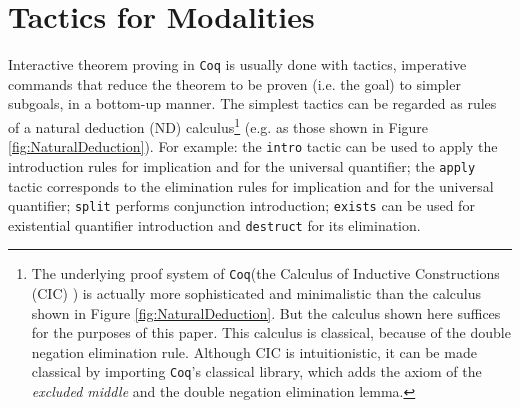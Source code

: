 \documentclass{llncs}
\newcommand{\Coq}{\texttt{Coq}\xspace}
\begin{document}
\section{Tactics for Modalities}
\label{sec:Tactics}

Interactive theorem proving in \Coq is usually done with tactics,
imperative commands that reduce the theorem to be proven (i.e. the
goal) to simpler subgoals, in a bottom-up manner. The simplest tactics
can be regarded as rules of a natural deduction (ND) calculus\footnote{The
underlying proof system of \Coq (the Calculus of Inductive
Constructions (CIC) \cite{Paulin}) is actually more sophisticated and
minimalistic than the calculus shown in Figure
\ref{fig:NaturalDeduction}. But the calculus shown here suffices for
the purposes of this paper. This calculus is classical, because of the double negation elimination rule. Although CIC is intuitionistic, it can be made classical by importing \Coq's classical library, which adds the axiom of the \emph{excluded middle} and the double negation elimination lemma.}
(e.g. as those shown in Figure
\ref{fig:NaturalDeduction}).  For example: the \texttt{intro} tactic
can be used to apply the introduction rules for implication and for
the universal quantifier; the \texttt{apply} tactic corresponds to the
elimination rules for implication and for the universal quantifier;
\texttt{split} performs conjunction introduction; \texttt{exists} can
be used for existential quantifier introduction and \texttt{destruct}
for its elimination.


\newcommand{\s}{\qquad}
\end{document}
